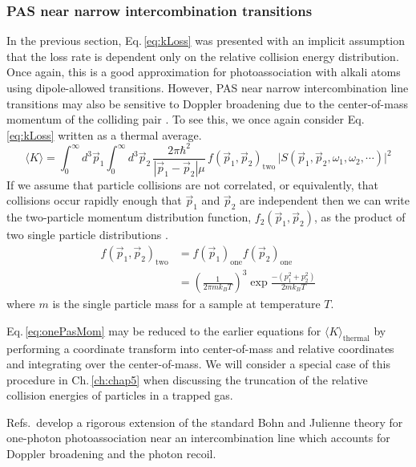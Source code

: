 \subsubsection{PAS near narrow intercombination transitions} \label{sssec:narrow_pa}
In the previous section, Eq.\,\ref{eq:kLoss} was presented with an implicit assumption that the loss rate is dependent only on the relative collision energy distribution.
Once again, this is a good approximation for photoassociation with alkali atoms using dipole-allowed transitions.
However, PAS near narrow intercombination line transitions may also be sensitive to Doppler broadening due to the center-of-mass momentum of the colliding pair \cite{Ciuryo2004,Reschovsky,Borkowski2014a}.
To see this, we once again consider Eq.\,\ref{eq:kLoss} written as a thermal average.
\begin{equation} \label{eq:onePasMom}
	 \langle K \rangle = \int_0^{\infty} d^3\vec{p}_1 \int_0^{\infty} d^3\vec{p}_2 \,\frac{2 \pi \hbar^2}{|\vec{p}_1 - \vec{p}_2| \mu} \, f( \vec{p}_1, \vec{p}_2 )_\text{two} \, \vert  S(\vec{p}_1, \vec{p}_2, \omega_1, \omega_2, \cdots) \vert^2  
\end{equation}
If we assume that particle collisions are not correlated, or equivalently, that collisions occur rapidly enough that $\vec{p}_1$ and $\vec{p}_2$ are independent then we can write the two-particle momentum distribution function, $f_2( \vec{p}_1, \vec{p}_2 )$, as the product of two single particle distributions \cite{Ehrenfest2015,Chliamovitch2017,Brown2008}. 
\begin{equation} \label{eq:3two_particle_prob}
\begin{split}
		 f( \vec{p}_1, \vec{p}_2 )_\text{two} &= f( \vec{p}_1 )_\text{one} f( \vec{p}_2 )_\text{one} \\
		  &= \left(\frac{1}{2 \pi m k_B T}\right)^3 \exp{\frac{-(p_1^2 + p_2^2)}{2 m k_B T}}
\end{split}
\end{equation}
where $m$ is the single particle mass for a sample at temperature $T$.

Eq.\,\ref{eq:onePasMom} may be reduced to the earlier equations for $\langle K \rangle_\text{thermal}$ by performing a coordinate transform into center-of-mass and relative coordinates and integrating over the center-of-mass.
We will consider a special case of this procedure in Ch.\,\ref{ch:chap5} when discussing the truncation of the relative collision energies of particles in a trapped gas.

Refs.\,\cite{Ciuryo2004, Borkowski2014a} develop a rigorous extension of the standard Bohn and Julienne theory for one-photon photoassociation near an intercombination line which accounts for Doppler broadening and the photon recoil.



